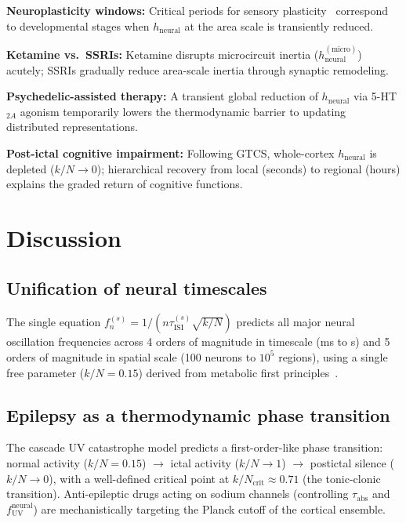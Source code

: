 \documentclass[aps,pre,twocolumn,showpacs,superscriptaddress,longbibliography]{revtex4-2}
\newcommand{\kN}{k/N}
\newcommand{\tauISI}{\tau_{\mathrm{ISI}}}
\newcommand{\tauabs}{\tau_{\mathrm{abs}}}
\newcommand{\hneu}{h_{\mathrm{neural}}}
\newcommand{\fUV}{f_{\mathrm{UV}}}
\begin{document}
\textbf{Neuroplasticity windows:} Critical periods for sensory
plasticity~\cite{Hensch2005} correspond to developmental stages
when $\hneu$ at the area scale is transiently reduced.

\textbf{Ketamine vs.\ SSRIs:} Ketamine disrupts microcircuit
inertia ($\hneu^{(\mathrm{micro})}$) acutely; SSRIs gradually
reduce area-scale inertia through synaptic remodeling.

\textbf{Psychedelic-assisted therapy:} A transient global
reduction of $\hneu$ via 5-HT$_{2A}$ agonism temporarily
lowers the thermodynamic barrier to updating distributed
representations.

\textbf{Post-ictal cognitive impairment:} Following GTCS,
whole-cortex $\hneu$ is depleted ($\kN \to 0$); hierarchical
recovery from local (seconds) to regional (hours) explains
the graded return of cognitive functions.

\section{\label{sec:discussion}Discussion}

\subsection{Unification of neural timescales}

The single equation $f_n^{(s)} = 1/(n\tauISI^{(s)}\sqrt{\kN})$
predicts all major neural oscillation frequencies across
4 orders of magnitude in timescale (ms to s) and 5 orders of
magnitude in spatial scale (100 neurons to $10^5$ regions),
using a single free parameter ($\kN = 0.15$) derived from
metabolic first principles~\cite{Attwell2001}.

\subsection{Epilepsy as a thermodynamic phase transition}

The cascade UV catastrophe model predicts a first-order-like
phase transition: normal activity ($\kN = 0.15$) $\to$ ictal
activity ($\kN \to 1$) $\to$ postictal silence ($\kN \to 0$),
with a well-defined critical point at
$\kN_{\mathrm{crit}} \approx 0.71$ (the tonic-clonic
transition). Anti-epileptic drugs acting on sodium channels
(controlling $\tauabs$ and $\fUV^{\mathrm{neural}}$) are
mechanistically targeting the Planck cutoff of the cortical
ensemble.
\end{document}
